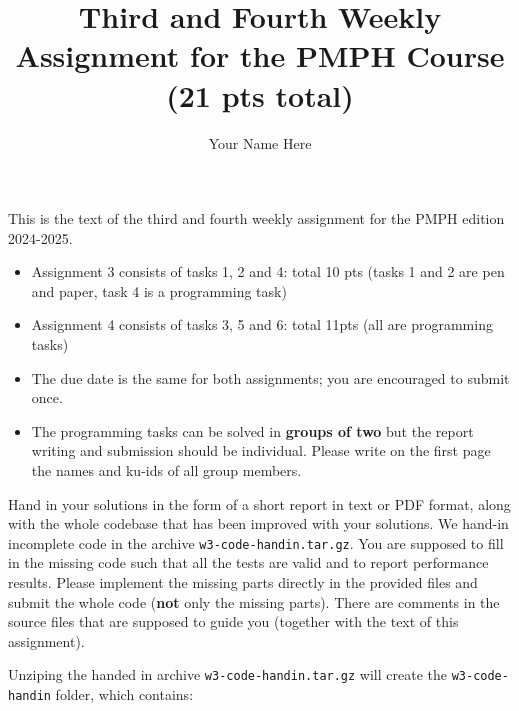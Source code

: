 \documentclass{article}
\title{Third and Fourth Weekly Assignment for the PMPH Course (21 pts total)}
\author{Your Name Here}
\date{}
\begin{document}
\maketitle

This is the text of the third and fourth weekly assignment for the PMPH 
edition 2024-2025.  

\begin{itemize}
    \item Assignment 3 consists of tasks 1, 2 and 4: total 10 pts (tasks 1 and 2 are pen and paper, task 4 is a programming task)
    \item Assignment 4 consists of tasks 3, 5 and 6: total 11pts (all are programming tasks)
    \item The due date is the same for both assignments; you are encouraged to submit once.
    \item The programming tasks can be solved in \textbf{groups of two} but the report writing and submission should be individual. Please write on the first page the names and ku-ids of all group members.
\end{itemize}

Hand in your solutions in the form of a short report in text or PDF
format, along with the whole codebase that has been improved with your
solutions. We hand-in incomplete code in 
the archive \texttt{w3-code-handin.tar.gz}. You are supposed to fill in the missing
code such that all the tests are valid and to report performance 
results. Please implement the missing parts directly in the provided
files and submit the whole code (\textbf{not} only the missing parts).
There are comments in the source files that are supposed to guide you
(together with the text of this assignment).

Unziping the handed in archive \texttt{w3-code-handin.tar.gz} will create the \texttt{w3-code-handin}
folder, which contains:
\end{document}

